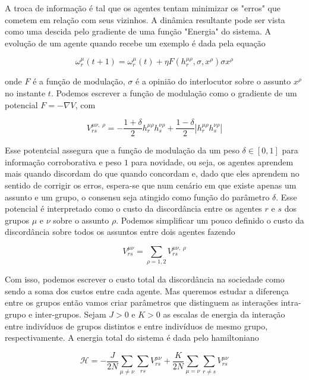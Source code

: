 \documentclass[a4paper, 11pt]{article} %
\begin{document}
A troca de informação é tal que os agentes tentam minimizar os "erros" que
cometem em relação com seus vizinhos. A dinâmica resultante pode ser vista como
uma descida pelo gradiente de uma função "Energia" do sistema. A evolução de um
agente quando recebe um exemplo é dada pela equação

\begin{equation}
    \omega^{\mu}_r(t+1)=\omega^{\mu}_r(t)+\eta F(h^{\mu\rho}_r,\sigma, x^{\rho})
    \sigma x^{\rho}
\end{equation}

onde $F$ é a função de modulação, $\sigma$ é a opinião do interlocutor sobre o
assunto $x^{\rho}$ no instante $t$. Podemos escrever a função de modulação como o
gradiente de um potencial $ F = -\nabla V $, com

\begin{equation}\label{subject-potential}
    V^{\mu\nu,\;\rho}_{rs} = -\frac{1+\delta}{2}h_r^{\mu\rho}h_s^{\nu\rho}
                      +\frac{1-\delta}{2}|h_r^{\mu\rho}h_s^{\nu\rho}|
\end{equation}

Esse potentcial assegura que a função de modulação da um peso $\delta \in [0,1]$
para informação corroborativa e peso $1$ para novidade, ou seja, os agentes
aprendem mais quando discordam do que quando concordam e, dado que eles aprendem
no sentido de corrigir os erros, espera-se que num cenário em que existe apenas
um assunto e um grupo, o consensu seja atingido como função do parâmetro
$\delta$. Esse potencial é interpretado como o custo da discordância entre os
agentes $r$ e $s$ dos grupos $\mu$ e $\nu$ sobre o assunto $\rho$. Podemos
simplificar um pouco definido o custo da discordância sobre todos os assuntos
entre dois agentes fazendo 

\begin{equation}\label{pair-potential}
    V^{\mu\nu}_{rs} = \sum_{\rho=1,2} V^{\mu\nu,\;\rho}_{rs}
\end{equation}

Com isso, podemos escrever o custo total da discordância na sociedade como sendo
a soma dos custos entre cada agente. Mas queremos estudar a diferença entre os
grupos então vamos criar parâmetros que distinguem as interações intra-grupo e
inter-grupos. Sejam $J>0$ e $K>0$ as escalas de energia da interação entre
indivíduos de grupos distintos e entre indivíduos de mesmo grupo,
respectivamente. A energia total do sistema é dada pelo hamiltoniano

\begin{equation}
    \mathcal{H} = -\frac{J}{2N}\sum_{\mu \ne \nu}\sum_{rs}V_{rs}^{\mu\nu}
                 +\frac{K}{2N}\sum_{\mu=\nu}\sum_{r\ne s}V_{rs}^{\mu\nu}
\end{equation}
\end{document}
